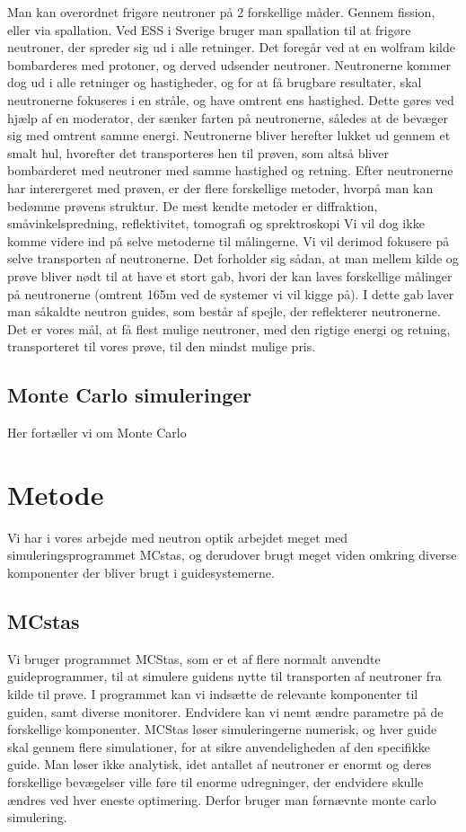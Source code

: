 \documentclass[12pt,oneside,a4paper]{article}
\begin{document}
{{{{{Man kan overordnet frigøre neutroner på 2 forskellige måder. Gennem fission, eller via spallation. Ved ESS i Sverige bruger man spallation til at frigøre neutroner, der spreder sig ud i alle retninger. Det foregår ved at en wolfram kilde bombarderes med protoner, og derved udsender neutroner. Neutronerne kommer dog ud i alle retninger og hastigheder, og for at få brugbare resultater, skal neutronerne fokuseres i en stråle, og have omtrent ens hastighed. Dette gøres ved hjælp af en moderator, der sænker farten på neutronerne, således at de bevæger sig med omtrent samme energi. Neutronerne bliver herefter lukket ud gennem et smalt hul, hvorefter det transporteres hen til prøven, som altså bliver bombarderet med neutroner med samme hastighed og retning. Efter neutronerne har interergeret med prøven, er der flere forskellige metoder, hvorpå man kan bedømme prøvens struktur. De mest kendte metoder er diffraktion, småvinkelspredning, reflektivitet, tomografi og sprektroskopi \cite{ess_folder}
Vi vil dog ikke komme videre ind på selve metoderne til målingerne. Vi vil derimod fokusere på selve transporten af neutronerne. Det forholder sig sådan, at man mellem kilde og prøve bliver nødt til at have et stort gab, hvori der kan laves forskellige målinger på neutronerne (omtrent 165m ved de systemer vi vil kigge på). I dette gab laver man såkaldte neutron guides, som består af spejle, der reflekterer neutronerne. Det er vores mål, at få flest mulige neutroner, med den rigtige energi og retning, transporteret til vores prøve, til den mindst mulige pris.


\subsection{Monte Carlo simuleringer}
Her fortæller vi om Monte Carlo 




\section{Metode}
Vi har i vores arbejde med neutron optik arbejdet meget med simuleringsprogrammet MCstas, og derudover brugt meget viden omkring diverse komponenter der bliver brugt i guidesystemerne.

\subsection{MCstas}
Vi bruger programmet MCStas, som er et af flere normalt anvendte guideprogrammer, til at simulere guidens nytte til transporten af neutroner fra kilde til prøve. I programmet kan vi indsætte de relevante komponenter til guiden, samt diverse monitorer. Endvidere kan vi nemt ændre parametre på de forskellige komponenter. MCStas løser simuleringerne numerisk, og hver guide skal gennem flere simulationer, for at sikre anvendeligheden af den specifikke guide. Man løser ikke analytisk, idet antallet af neutroner er enormt og deres forskellige bevægelser ville føre til enorme udregninger, der endvidere skulle ændres ved hver eneste optimering. Derfor bruger man førnævnte monte carlo simulering. 

}}}}}
\end{document}
